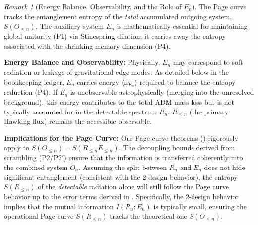 \documentclass[a4paper,11pt]{article}
\theoremstyle{plain}
\theoremstyle{definition}
\theoremstyle{remark}
\newtheorem{remark}{Remark}
\begin{document}
\begin{remark}[Energy Balance, Observability, and the Role of $E_n$]\label{rem:entropy_target_E_n}
The Page curve tracks the entanglement entropy of the \emph{total} accumulated outgoing system, $S(O_{\le n})$. The auxiliary system $E_n$ is mathematically essential for maintaining global unitarity (P1) via Stinespring dilation; it carries away the entropy associated with the shrinking memory dimension (P4).

\textbf{Energy Balance and Observability:} Physically, $E_n$ may correspond to soft radiation or leakage of gravitational edge modes. As detailed below in the bookkeeping ledger, $E_n$ carries energy $\langle \omega_{E_{n}}\rangle$ required to balance the entropy reduction (P4). If $E_n$ is unobservable astrophysically (merging into the unresolved background), this energy contributes to the total ADM mass loss but is not typically accounted for in the detectable spectrum $R_n$. $R_{\le n}$ (the primary Hawking flux) remains the accessible observable.

\textbf{Implications for the Page Curve:} Our Page-curve theorems () rigorously apply to $S(O_{\le n})=S(R_{\le n}E_{\le n})$. The decoupling bounds derived from scrambling (P2/P2$'$) ensure that the information is transferred coherently into the combined system $O_n$. Assuming the split between $R_n$ and $E_n$ does not hide significant entanglement (consistent with the 2-design behavior), the entropy $S(R_{\le n})$ of the \emph{detectable} radiation alone will still follow the Page curve behavior up to the error terms derived in .
Specifically, the 2-design behavior implies that the mutual information $I(R_n:E_n)$ is typically small, ensuring the operational Page curve $S(R_{\le n})$ tracks the theoretical one $S(O_{\le n})$.
\end{remark}
\end{document}
